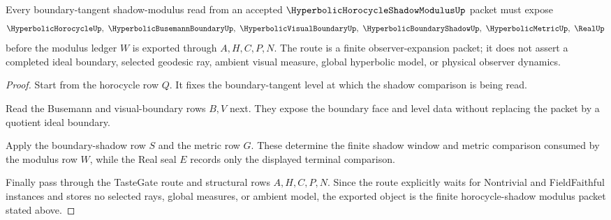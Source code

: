 \begin{theorem}
\label{thm:hyperbolic-horocycle-shadow-modulus-boundary-route}
Every boundary-tangent shadow-modulus read from an accepted $\HyperbolicHorocycleShadowModulusUp$ packet must expose
$$
\HyperbolicHorocycleUp,\ \HyperbolicBusemannBoundaryUp,\ \HyperbolicVisualBoundaryUp,\ \HyperbolicBoundaryShadowUp,\ \HyperbolicMetricUp,\ \RealUp
$$
before the modulus ledger $W$ is exported through $A,H,C,P,N$. The route is a finite observer-expansion packet; it does not assert a completed ideal boundary, selected geodesic ray, ambient visual measure, global hyperbolic model, or physical observer dynamics.
\end{theorem}
\begin{proof}
Start from the horocycle row $Q$. It fixes the boundary-tangent level at which the shadow comparison is being read.

Read the Busemann and visual-boundary rows $B,V$ next. They expose the boundary face and level data without replacing the packet by a quotient ideal boundary.

Apply the boundary-shadow row $S$ and the metric row $G$. These determine the finite shadow window and metric comparison consumed by the modulus row $W$, while the Real seal $E$ records only the displayed terminal comparison.

Finally pass through the TasteGate route and structural rows $A,H,C,P,N$. Since the route explicitly waits for Nontrivial and FieldFaithful instances and stores no selected rays, global measures, or ambient model, the exported object is the finite horocycle-shadow modulus packet stated above.
\end{proof}



